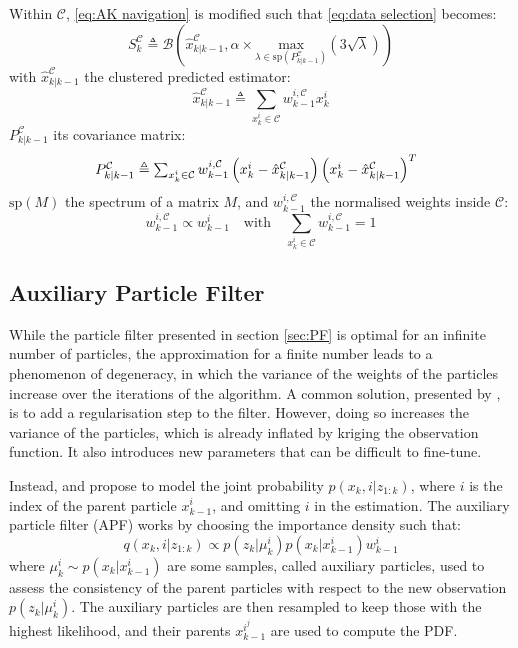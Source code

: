 \documentclass[conference]{IEEEtran}
\begin{document}
Within $\mathcal{C}$, \eqref{eq:AK navigation} is modified such that \eqref{eq:data selection} becomes:
\begin{equation}
S_k^\mathcal{C}\triangleq\mathcal{B}\left(\hat{x}_{k|k-1}^\mathcal{C},\alpha\times\underset{\lambda\in\text{sp}\left(P_{k|k-1}^\mathcal{C}\right)}{\text{max}}\left(3\sqrt{\lambda}\right)\right)\label{eq:clustered selection}
\end{equation}
with $\hat{x}_{k|k-1}^\mathcal{C}$ the clustered predicted estimator:
\begin{equation}
\textstyle\hat{x}_{k|k-1}^\mathcal{C}\triangleq\sum_{x_k^i\in\mathcal{C}}w_{k-1}^{i,\mathcal{C}}x_k^i
\end{equation}
$P_{k|k-1}^\mathcal{C}$ its covariance matrix:
\begin{equation}
\hspace*{-2mm}\textstyle P_{k|k-1}^\mathcal{C}\triangleq\sum_{x_k^i\in\mathcal{C}}w_{k-1}^{i,\mathcal{C}}\left(x_k^i-\hat{x}_{k|k-1}^\mathcal{C}\right)\left(x_k^i-\hat{x}_{k|k-1}^\mathcal{C}\right)^T
\end{equation}
$\text{sp}(M)$ the spectrum of a matrix $M$, and $w_{k-1}^{i,\mathcal{C}}$ the normalised weights inside $\mathcal{C}$:
\begin{equation}
\textstyle w_{k-1}^{i,\mathcal{C}}\propto w_{k-1}^i\quad\text{with}\quad\sum_{x_k^i\in\mathcal{C}}w_{k-1}^{i,\mathcal{C}}=1
\end{equation}

\subsection{Auxiliary Particle Filter}\label{sec:APF}

While the particle filter presented in section \ref{sec:PF} is optimal for an infinite number of particles, the approximation for a finite number leads to a phenomenon of degeneracy, in which the variance of the weights of the particles increase over the iterations of the algorithm. A common solution, presented by \cite{bib:RPF}, is to add a regularisation step to the filter. However, doing so increases the variance of the particles, which is already inflated by kriging the observation function. It also introduces new parameters that can be difficult to fine-tune.

Instead, \cite{bib:APF} and \cite{bib:APF-opti} propose to model the joint probability $p(x_k,i|z_{1:k})$, where $i$ is the index of the parent particle $x_{k-1}^i$, and omitting $i$ in the estimation. The auxiliary particle filter (APF) works by choosing the importance density such that:
\begin{equation}
q(x_k,i|z_{1:k})\propto p(z_k|\mu_k^i)p(x_k|x_{k-1}^i)w_{k-1}^i\label{eq:auxiliary importance}
\end{equation}
where $\mu_k^i\sim p(x_k|x_{k-1}^i)$ are some samples, called auxiliary particles, used to assess the consistency of the parent particles with respect to the new observation $p(z_k|\mu_k^i)$. The auxiliary particles are then resampled to keep those with the highest likelihood, and their parents $x_{k-1}^{i^j}$ are used to compute the PDF.
\end{document}
